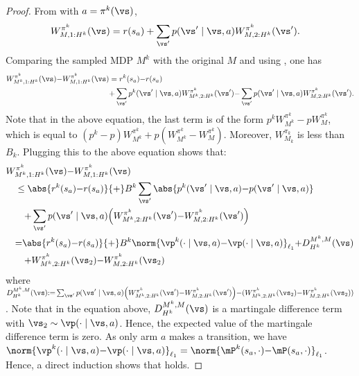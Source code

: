 \begin{subappendices}
\begin{proof}
    From  with $a=\pi^k(\vs)$,
    \begin{align}
        W^{\pi^k}_{M, 1:H^k}(\vs) 
        &=r(s_a) + \sum_{\vs'} p(\vs' \mid \vs,a)W^{\pi^k}_{M,2:H^k}(\vs'). \label{eq:decompo2}
    \end{align}
    Comparing the sampled MDP $M^k$ with the original $M$ and using , one has
    \begin{align}
        W^{\pi^k}_{M^k, 1:H^k}(\vs) {-} W^{\pi^k}_{M, 1:H^k}(\vs)
        &= r^k(s_a) {-} r(s_a) \nonumber \\
        &{+} \sum_{\vs'} p^k(\vs'\mid \vs,a)W^{\pi^k}_{M^k, 2:H^k}(\vs') {-} \sum_{\vs'} p(\vs' \mid \vs,a)W^{\pi^k}_{M,2:H^k}(\vs') \label{eq:depend_S}.
    \end{align}
    Note that in the above equation, the last term is of the form $p^kW^{\pi^k}_{M^k} {-}pW^{\pi^k}_{M}$, which is equal to $(p^k {-}p)W^{\pi^k}_{M^k} {+}p(W^{\pi^k}_{M^k} {-}W^{\pi^k}_{M})$. Moreover, $W_{M_k}^{\pi_k}$ is less than $B_k$.
    Plugging this to the above equation shows that:
    \begin{align*}
        &W^{\pi^k}_{M^k, 1:H^k}(\vs) {-} W^{\pi^k}_{M, 1:H^k}(\vs) \\
        &\quad\le \abs{r^k(s_a) {-} r(s_a)} {+} B^k\sum_{\vs'}\abs{p^k(\vs'\mid \vs,a) {-} p(\vs' \mid \vs,a)}\\
        &\qquad {+} \sum_{\vs'} p(\vs' \mid \vs,a)\Bigl(W^{\pi^k}_{M^k, 2:H^k}(\vs') {-} W^{\pi^k}_{M, 2:H^k}(\vs')\Bigr)\\
        &\quad {=}\abs{r^k(s_a) {-} r(s_a)} {+} B^k\norm{\vp^k(\cdot\mid \vs,a) {-} \vp(\cdot \mid \vs,a)}_{\ell_1} {+} D^{M^k,M}_{H^k}(\vs) \\
        &\qquad {+}W^{\pi^k}_{M^k, 2:H^k}(\vs_2) {-} W^{\pi^k}_{M, 2:H^k}(\vs_2)
    \end{align*}
    where $D^{M^k,M}_{H^k}(\vs){:=} \sum_{\vs'}p(\vs' \mid \vs,a)\Bigl(W^{\pi^k}_{M^k, 2:H^k}(\vs') {-} W^{\pi^k}_{M, 2:H^k}(\vs')\Bigr) {-}(W^{\pi^k}_{M^k, 2:H^k}(\vs_2) {-} W^{\pi^k}_{M, 2:H^k}(\vs_2))$.
    Note that in the equation above, $D^{M^k,M}_{H^k}(\vs)$ is a martingale difference term with ${\vs_2\sim \vp(\cdot \mid \vs,a)}$.
    Hence, the expected value of the martingale difference term is zero.
    As only arm $a$ makes a transition, we have $\norm{\vp^k(\cdot\mid \vs,a) {-} \vp(\cdot \mid \vs,a)}_{\ell_1}=\norm{\mP^{k}(s_{a},\cdot){-}\mP(s_{a},\cdot)}_{\ell_1}$. Hence, a direct induction shows that  holds.
\end{proof}

\end{subappendices}
